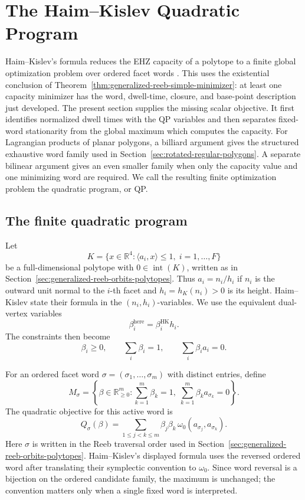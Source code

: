 \section{The Haim--Kislev Quadratic Program}
\label{sec:quadratic-program-algorithm-hk2019}

Haim--Kislev's formula reduces the EHZ capacity of a polytope to a finite
global optimization problem over ordered facet words \cite{HK2017}.  This
uses the existential conclusion of
Theorem~\ref{thm:generalized-reeb-simple-minimizer}: at least one capacity
minimizer has the word, dwell-time, closure, and base-point description just
developed.  The present section supplies the missing scalar objective.  It
first identifies normalized dwell times with the QP variables and then
separates fixed-word stationarity from the global maximum which computes the
capacity.  For Lagrangian products of planar polygons, a billiard argument
gives the structured exhaustive word family used in
Section~\ref{sec:rotated-regular-polygons}.  A separate bilinear argument gives
an even smaller family when only the capacity value and one minimizing word
are required.  We call the resulting finite optimization problem the
quadratic program, or QP.

\subsection{The finite quadratic program}
\label{subsec:quadratic-program-algorithm-hk2019-general-polytopes}

Let
\[
  K=\{x\in\mathbb{R}^4:\langle a_i,x\rangle\leq 1,\;
    i=1,\ldots,F\}
\]
be a full-dimensional polytope with \(0\in\operatorname{int}(K)\), written as
in Section~\ref{sec:generalized-reeb-orbits-polytopes}. Thus
\(a_i=n_i/h_i\) if \(n_i\) is the outward unit normal to the \(i\)-th facet and
\(h_i=h_K(n_i)>0\) is its height. Haim--Kislev state their formula in the
\((n_i,h_i)\)-variables. We use the equivalent dual-vertex variables
\[
  \beta_i^{\mathrm{here}}=\beta_i^{\mathrm{HK}}h_i.
\]
The constraints then become
\[
  \beta_i\geq0,\qquad
  \sum_i\beta_i=1,\qquad
  \sum_i\beta_i a_i=0.
\]

For an ordered facet word
\(\sigma=(\sigma_1,\ldots,\sigma_m)\) with distinct entries, define
\[
  M_\sigma
  =
  \left\{
    \beta\in\mathbb{R}_{\geq0}^m:
    \sum_{k=1}^m\beta_k=1,\;
    \sum_{k=1}^m\beta_k a_{\sigma_k}=0
  \right\}.
\]
The quadratic objective for this active word is
\begin{equation}\label{eq:quadratic-program-algorithm-hk2019-q}
  Q_\sigma(\beta)
  =
  \sum_{1\leq j<k\leq m}
    \beta_j\beta_k\,\omega_0(a_{\sigma_j},a_{\sigma_k}).
\end{equation}
Here \(\sigma\) is written in the Reeb traversal order used in
Section~\ref{sec:generalized-reeb-orbits-polytopes}. Haim--Kislev's displayed
formula uses the reversed ordered word after translating their symplectic
convention to \(\omega_0\). Since word reversal is a bijection on the ordered
candidate family, the maximum is unchanged; the convention matters only when a
single fixed word is interpreted.

